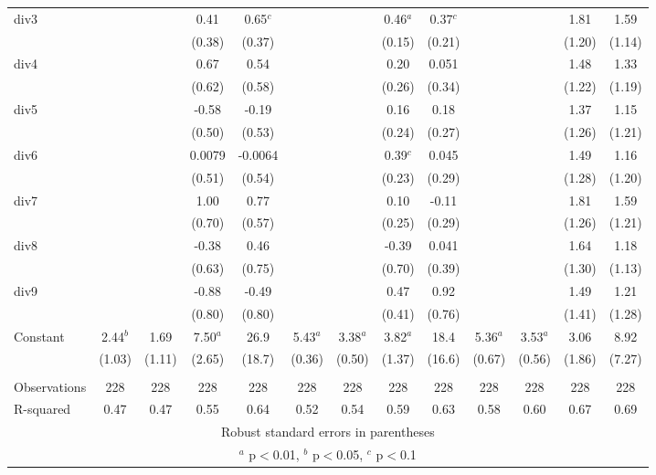 \documentclass[]{article}
\begin{document}
\begin{tabular}{lcccccccccccc}
div3 &  &  & 0.41 & 0.65$^c$ &  &  & 0.46$^a$ & 0.37$^c$ &  &  & 1.81 & 1.59 \\
 &  &  & (0.38) & (0.37) &  &  & (0.15) & (0.21) &  &  & (1.20) & (1.14) \\
div4 &  &  & 0.67 & 0.54 &  &  & 0.20 & 0.051 &  &  & 1.48 & 1.33 \\
 &  &  & (0.62) & (0.58) &  &  & (0.26) & (0.34) &  &  & (1.22) & (1.19) \\
div5 &  &  & -0.58 & -0.19 &  &  & 0.16 & 0.18 &  &  & 1.37 & 1.15 \\
 &  &  & (0.50) & (0.53) &  &  & (0.24) & (0.27) &  &  & (1.26) & (1.21) \\
div6 &  &  & 0.0079 & -0.0064 &  &  & 0.39$^c$ & 0.045 &  &  & 1.49 & 1.16 \\
 &  &  & (0.51) & (0.54) &  &  & (0.23) & (0.29) &  &  & (1.28) & (1.20) \\
div7 &  &  & 1.00 & 0.77 &  &  & 0.10 & -0.11 &  &  & 1.81 & 1.59 \\
 &  &  & (0.70) & (0.57) &  &  & (0.25) & (0.29) &  &  & (1.26) & (1.21) \\
div8 &  &  & -0.38 & 0.46 &  &  & -0.39 & 0.041 &  &  & 1.64 & 1.18 \\
 &  &  & (0.63) & (0.75) &  &  & (0.70) & (0.39) &  &  & (1.30) & (1.13) \\
div9 &  &  & -0.88 & -0.49 &  &  & 0.47 & 0.92 &  &  & 1.49 & 1.21 \\
 &  &  & (0.80) & (0.80) &  &  & (0.41) & (0.76) &  &  & (1.41) & (1.28) \\
Constant & 2.44$^b$ & 1.69 & 7.50$^a$ & 26.9 & 5.43$^a$ & 3.38$^a$ & 3.82$^a$ & 18.4 & 5.36$^a$ & 3.53$^a$ & 3.06 & 8.92 \\
 & (1.03) & (1.11) & (2.65) & (18.7) & (0.36) & (0.50) & (1.37) & (16.6) & (0.67) & (0.56) & (1.86) & (7.27) \\
 &  &  &  &  &  &  &  &  &  &  &  &  \\
Observations & 228 & 228 & 228 & 228 & 228 & 228 & 228 & 228 & 228 & 228 & 228 & 228 \\
 R-squared & 0.47 & 0.47 & 0.55 & 0.64 & 0.52 & 0.54 & 0.59 & 0.63 & 0.58 & 0.60 & 0.67 & 0.69 \\ \hline
\multicolumn{13}{c}{ Robust standard errors in parentheses} \\
\multicolumn{13}{c}{ $^a$ p$<$0.01, $^b$ p$<$0.05, $^c$ p$<$0.1} \\
\end{tabular}
\end{document}
